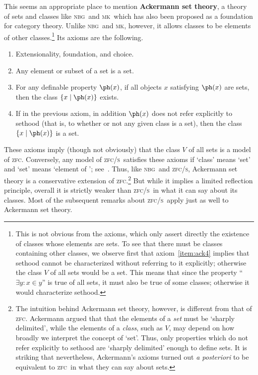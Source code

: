 \documentclass[12pt]{amsart}
\def\zfc{\textsc{zfc}}
\def\zfcs{\textsc{zfc/s}}
\def\nbg{\textsc{nbg}}
\def\mk{\textsc{mk}}
\begin{document}
\begin{rmk}
  This seems an appropriate place to mention \textbf{Ackermann set
    theory}, a theory of sets and classes like \nbg\ and \mk\ which
  has also been proposed as a foundation for category theory.  Unlike
  \nbg\ and \mk, however, it allows classes to be elements of other
  classes.\footnote{This is not obvious from the axioms, which only
    assert directly the existence of classes whose elements are sets.
    To see that there must be classes containing other classes, we
    observe first that axiom~\ref{item:ack4} implies that sethood
    cannot be characterized without referring to it explicitly;
    otherwise the class $V$ of all sets would be a set.  This means
    that since the property ``$\exists y: x\in y$'' is true of all
    sets, it must also be true of some classes; otherwise it would
    characterize sethood.} Its axioms are the following.
  \begin{enumerate}
  \item Extensionality, foundation, and choice.
  \item Any element or subset of a set is a set.
  \item For any definable property $\ph(x)$, if all objects $x$
    satisfying $\ph(x)$ are sets, then the class $\{x\mid \ph(x)\}$
    exists.
  \item If in the previous axiom, in addition $\ph(x)$ does not refer
    explicitly to sethood (that is, to whether or not any given class is
    a set), then the class $\{x\mid \ph(x)\}$ is a set.\label{item:ack4}
  \end{enumerate}
  These axioms imply (though not obviously) that the class $V$ of all
  sets is a model of \zfc.  Conversely, any model of \zfcs\ satisfies
  these axioms if `class' means `set' and `set' means `element of
  \bbS'; see~\cite{levy:ackermann,reinhardt:ackermann}.  Thus, like
  \nbg\ and \zfcs, Ackermann set theory is a conservative extension of
  \zfc.\footnote{The intuition behind Ackermann set theory, however,
    is different from that of \zfc.  Ackermann argued that that the
    elements of a \emph{set} must be `sharply delimited', while the
    elements of a \emph{class}, such as $V$, may depend on how broadly
    we interpret the concept of `set'.  Thus, only properties which do
    not refer explicitly to sethood are `sharply delimited' enough to
    define sets.  It is striking that nevertheless, Ackermann's axioms
    turned out \emph{a posteriori} to be equivalent to \zfc\ in what
    they can say about sets.}  But while it implies a limited
  reflection principle, overall it is strictly weaker than \zfcs\ in
  what it can say about its classes.  Most of the subsequent remarks
  about \zfcs\ apply just as well to Ackermann set theory.
\end{rmk}
\end{document}
